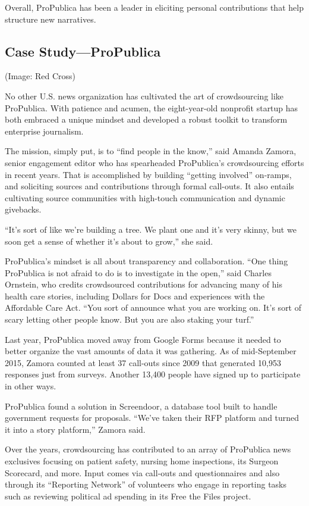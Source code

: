 \begin{itemize}
\begin{enumerate}
{Overall, ProPublica has been a leader in eliciting personal contributions that help structure new narratives.

\subsection{Case Study---ProPublica} (Image: Red Cross)
 
No other U.S. news organization has cultivated the art of crowdsourcing like ProPublica. With patience and acumen, the eight-year-old nonprofit startup has both embraced a unique mindset and developed a robust toolkit to transform enterprise journalism.

The mission, simply put, is to ``find people in the know,'' said Amanda Zamora, senior engagement editor who has spearheaded ProPublica’s crowdsourcing efforts in recent years. That is accomplished by building ``getting involved'' on-ramps, and soliciting sources and contributions through formal call-outs. It also entails cultivating source communities with high-touch communication and dynamic givebacks.

``It’s sort of like we’re building a tree. We plant one and it’s very skinny, but we soon get a sense of whether it’s about to grow,'' she said.\autocite{Zamora}

ProPublica’s mindset is all about transparency and collaboration. ``One thing ProPublica is not afraid to do is to investigate in the open,'' said Charles Ornstein, who credits crowdsourced contributions for advancing many of his health care stories, including Dollars for Docs and experiences with the Affordable Care Act. ``You sort of announce what you are working on. It’s sort of scary letting other people know. But you are also staking your turf.''\autocite{Ornstein}

Last year, ProPublica moved away from Google Forms because it needed to better organize the vast amounts of data it was gathering. As of mid-September 2015, Zamora counted at least 37 call-outs since 2009 that generated 10,953 responses just from surveys. Another 13,400 people have signed up to participate in other ways.

ProPublica found a solution in Screendoor, a database tool built to handle government requests for proposals. ``We’ve taken their RFP platform and turned it into a story platform,'' Zamora said.

Over the years, crowdsourcing has contributed to an array of ProPublica news exclusives focusing on patient safety, nursing home inspections, its Surgeon Scorecard, and more. Input comes via call-outs and questionnaires and also through its ``Reporting Network'' of volunteers who engage in reporting tasks such as reviewing political ad spending in its Free the Files project.\autocite{Files}

}
\end{enumerate}
\end{itemize}
